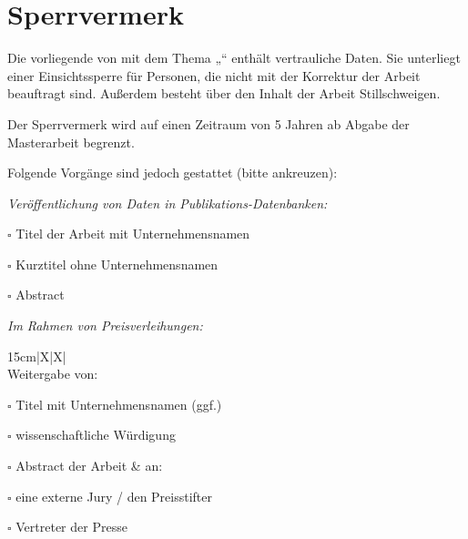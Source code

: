 \chapter*{Sperrvermerk}
\enlargethispage{3pt}
\linespread{1}
\WarningsOff[nag]
\noindent
Die vorliegende \getThesisType{} von \getAuthor{} mit dem Thema „\getTitle{}“ enthält vertrauliche Daten. Sie unterliegt einer Einsichtssperre für Personen, die nicht mit der Korrektur der Arbeit beauftragt sind. Außerdem besteht über den Inhalt der Arbeit Stillschweigen. 

\noindent
Der Sperrvermerk wird auf einen Zeitraum von 5 Jahren ab Abgabe der Masterarbeit begrenzt.

\noindent
Folgende Vorgänge sind jedoch gestattet (bitte ankreuzen):

\vspace{5mm}
\noindent\textit{Veröffentlichung von Daten in Publikations-Datenbanken:}
\par\noindent$\square$ Titel der Arbeit mit Unternehmensnamen
\par\noindent$\square$ Kurztitel ohne Unternehmensnamen 
\par\noindent$\square$ Abstract 
\vspace{5mm}
\par\noindent\textit{Im Rahmen von Preisverleihungen:} 
\begin{table}[h]
\footnotesize 
\noindent
\begin{tabularx}{15cm}{|X|X|}
\hline
{}                                                               \\ \hline
Weitergabe von: 
\par\noindent$\square$ Titel mit Unternehmensnamen (ggf.)
\par\noindent$\square$ wissenschaftliche Würdigung
\par\noindent$\square$ Abstract der Arbeit
& 
an:
\par\noindent$\square$ eine externe Jury / den Preisstifter
\par\noindent$\square$ Vertreter der Presse\\
\hline
\end{tabularx}
\end{table}

